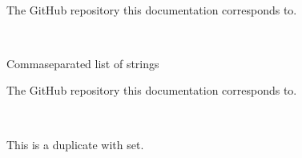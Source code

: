 \documentclass[letterpaper,10pt,english]{sphinxmanual}
\begin{document}
\begin{fulllineitems}
\label{\detokenize{confval:confval-github_repository}}~
\vspace{-45px}

\begin{DUlineblock}{0em}
\item[]  
\item[]  
\end{DUlineblock}

\vspace{-25px}

The GitHub repository this documentation corresponds to.

\end{fulllineitems}



\vspace{5px}

\begin{fulllineitems}
\label{\detokenize{confval:confval-conda_channels}}~
\vspace{-45px}

\begin{DUlineblock}{0em}
\item[]  Comma\sphinxhyphen{}separated list of strings
\item[]  
\end{DUlineblock}

\vspace{-25px}

The GitHub repository this documentation corresponds to.

\end{fulllineitems}



\vspace{5px}

\begin{fulllineitems}
~
\vspace{-45px}

\begin{DUlineblock}{0em}
\item[]  
\end{DUlineblock}

\vspace{-25px}

This is a duplicate with  set.

\end{fulllineitems}
\end{document}
